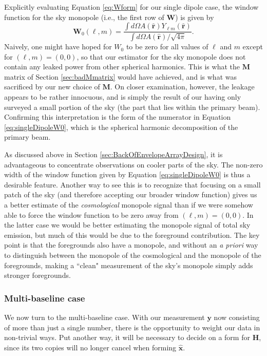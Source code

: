 \documentclass[twolcolumn,apj,iop,numberedappendix]{emulateapj}
\newcommand{\xhat}{\hat{\mathbf{x}}}
\newcommand{\Hmat}{\mathbf{H}}
\newcommand{\M}{\mathbf{M}}
\newcommand{\W}{\mathbf{W}}
\begin{document}
Explicitly evaluating Equation \eqref{eq:Wform} for our single dipole case, the window function for the sky monopole (i.e., the first row of $\W$) is given by
\begin{equation}
\W_{0}(\ell,m) = \frac{\int d\Omega A(\mathbf{\hat{r}}) Y_{\ell m} (\mathbf{\hat{r}})}{\int d\Omega A(\mathbf{\hat{r}}) / \sqrt{4 \pi}}.
\label{eq:singleDipoleW0}
\end{equation}
Naively, one might have hoped for $W_0$ to be zero for all values of $\ell$ and $m$ except for $(\ell, m) = (0,0)$, so that our estimator for the sky monopole does not contain any leaked power from other spherical harmonics. This is what the $\M$ matrix of Section \ref{sec:badMmatrix} would have achieved, and is what was sacrificed by our new choice of $\M$. On closer examination, however, the leakage appears to be rather innocuous, and is simply the result of our having only surveyed a small portion of the sky (the part that lies within the primary beam). Confirming this interpretation is the form of the numerator in Equation \eqref{eq:singleDipoleW0}, which is the spherical harmonic decomposition of the primary beam.

As discussed above in Section \ref{sec:BackOfEnvelopeArrayDesign}, it is advantageous to concentrate observations on cooler parts of the sky. The non-zero width of the window function given by Equation \eqref{eq:singleDipoleW0} is thus a desirable feature. Another way to see this is to recognize that focusing on a small patch of the sky (and therefore accepting our broader window function) gives us a better estimate of the \emph{cosmological} monopole signal than if we were somehow able to force the window function to be zero away from $(\ell,m) = (0,0)$. In the latter case we would be better estimating the monopole signal of total sky emission, but much of this would be due to the foreground contribution. The key point is that the foregrounds also have a monopole, and without an \emph{a priori} way to distinguish between the monopole of the cosmological and the monopole of the foregrounds, making a ``clean" measurement of the sky's monopole simply adds stronger foregrounds.

\subsubsection{Multi-baseline case}

We now turn to the multi-baseline case. With our measurement $\mathbf{y}$ now consisting of more than just a single number, there is the opportunity to weight our data in non-trivial ways. Put another way, it will be necessary to decide on a form for $\Hmat$, since its two copies will no longer cancel when forming $\xhat$.
\end{document}
